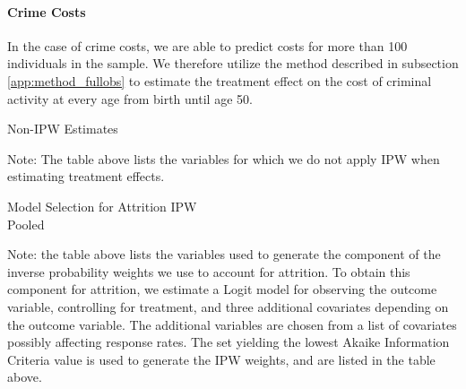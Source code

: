 \paragraph{Crime Costs}

\noindent In the case of crime costs, we are able to predict costs for more than 100 individuals in the
sample. We therefore utilize the method described in subsection \ref{app:method_fullobs}
to estimate the treatment effect on the cost of criminal activity at every age from birth until age 50. \\


\begin{table}[H]
\begin{threeparttable}
\caption{Non-IPW Estimates}
\label{table:nonipw}
\centering

\begin{tablenotes}
\footnotesize
\item Note: The table above lists the variables for which we do not apply IPW when estimating
treatment effects.
\end{tablenotes}
\end{threeparttable}
\end{table}



\begin{table}
\caption{Model Selection for Attrition IPW \\ Pooled }
\label{table:ms_attrit_pooled}
\centering
\begin{adjustbox}{max width=\textwidth}
\begin{threeparttable}

\begin{tablenotes}
\tiny
\item Note: the table above lists the variables used to generate the component of the
inverse probability weights we use to account for attrition. To obtain this
component for attrition, we estimate a Logit model for observing the outcome variable,
controlling for treatment, and three additional covariates depending on the outcome
variable. The additional variables are chosen from a list of covariates possibly affecting
response rates. The set yielding the lowest Akaike Information Criteria value is used to
generate the IPW weights, and are listed in the table above.
\end{tablenotes}
\end{threeparttable}
\end{adjustbox}
\end{table}


